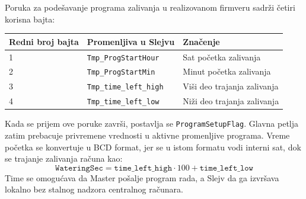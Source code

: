\documentclass[12pt]{article}
\numberwithin{figure}{section}
\begin{document}
  Poruka za podešavanje programa zalivanja u realizovanom firmveru sadrži četiri korisna bajta:
  \begin{center}
  \small
  \begin{tabular}{|m{2.4cm}|m{4.5cm}|m{6cm}|}
    \hline
    Redni broj bajta & Promenljiva u Slejvu & Značenje \\ \hline
    1 & \texttt{Tmp\_ProgStartHour} & Sat početka zalivanja \\ \hline
    2 & \texttt{Tmp\_ProgStartMin} & Minut početka zalivanja \\ \hline
    3 & \texttt{Tmp\_time\_left\_high} & Viši deo trajanja zalivanja \\ \hline
    4 & \texttt{Tmp\_time\_left\_low} & Niži deo trajanja zalivanja \\ \hline
  \end{tabular}
  \end{center}
  \normalsize

  Kada se prijem ove poruke završi, postavlja se \texttt{ProgramSetupFlag}. 
  Glavna petlja zatim prebacuje privremene vrednosti u aktivne promenljive programa. 
  Vreme početka se konvertuje u BCD format, jer se u istom formatu vodi interni sat, dok se trajanje zalivanja računa kao:
  \[
    \texttt{WateringSec} = \texttt{time\_left\_high} \cdot 100 + \texttt{time\_left\_low}
  \]
  Time se omogućava da Master pošalje program rada, a Slejv da ga izvršava lokalno bez stalnog nadzora centralnog računara.
\end{document}
